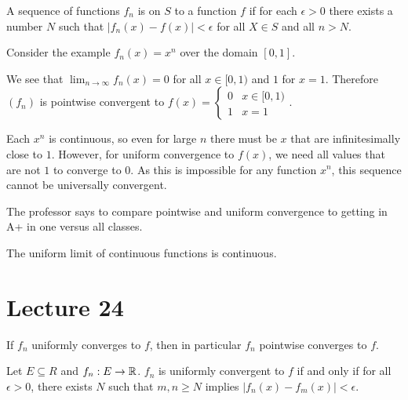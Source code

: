 \documentclass{book}
\begin{document}
\begin{definition} 
    A sequence of functions $f_n$ is  on $S$ to a function $f$ if for each $\epsilon > 0$ there exists a number $N$ such that $|f_n(x) - f(x)| < \epsilon$ for all $X \in S$ and all $n > N$.
\end{definition}

Consider the example $f_n(x) = x^n$ over the domain $[0, 1]$. 

We see that $\lim_{n \to \infty} f_n(x) = 0$ for all $x \in [0, 1)$ and $1$ for $x = 1$. Therefore $(f_n)$ is pointwise convergent to $f(x) = \begin{cases} 0 & x \in [0, 1) \\ 1 & x = 1 \end{cases}$.

Each $x^n$ is continuous, so even for large $n$ there must be $x$ that are infinitesimally close to $1$. However, for uniform convergence to $f(x)$, we need all values that are not $1$ to converge to $0$. As this is impossible for any function $x^n$, this sequence cannot be universally convergent.

The professor says to compare pointwise and uniform convergence to getting in A+ in one versus all classes.

\begin{thm}
    The uniform limit of continuous functions is continuous.
\end{thm}

\section{Lecture 24}

\begin{remark}
    If $f_n$ uniformly converges to $f$, then in particular $f_n$ pointwise converges to $f$. 
\end{remark}

\begin{thm}
    Let $E \subseteq R$ and $f_n: E \to \mathbb{R}$. $f_n$ is uniformly convergent to $f$ if and only if for all $\epsilon > 0$, there exists $N$ such that $m, n \geq N$ implies $|f_n(x) - f_m(x)| < \epsilon$.
\end{thm}
\end{document}
